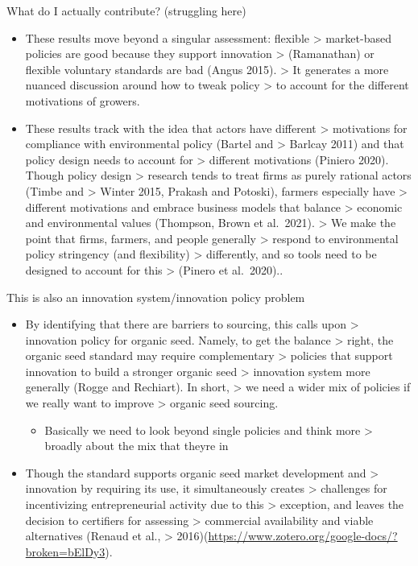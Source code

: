 \documentclass[twoside,12pt,final]{ucthesis-CA2012}
\providecommand{\tightlist}{%
  \setlength{\itemsep}{0pt}\setlength{\parskip}{0pt}}
\begin{document}
\begin{ucmainmatter}
What do I actually contribute? (struggling here)
\begin{itemize}
\item
  These results move beyond a singular assessment: flexible
  \textgreater{} market-based policies are good because they support innovation
  \textgreater{} (Ramanathan) or flexible voluntary standards are bad (Angus 2015).
  \textgreater{} It generates a more nuanced discussion around how to tweak policy
  \textgreater{} to account for the different motivations of growers.
\item
  These results track with the idea that actors have different
  \textgreater{} motivations for compliance with environmental policy (Bartel and
  \textgreater{} Barlcay 2011) and that policy design needs to account for
  \textgreater{} different motivations (Piniero 2020). Though policy design
  \textgreater{} research tends to treat firms as purely rational actors (Timbe and
  \textgreater{} Winter 2015, Prakash and Potoski), farmers especially have
  \textgreater{} different motivations and embrace business models that balance
  \textgreater{} economic and environmental values (Thompson, Brown et al.~2021).
  \textgreater{} We make the point that firms, farmers, and people generally
  \textgreater{} respond to environmental policy stringency (and flexibility)
  \textgreater{} differently, and so tools need to be designed to account for this
  \textgreater{} (Pinero et al.~2020)..
\end{itemize}
This is also an innovation system/innovation policy problem
\begin{itemize}
\item
  By identifying that there are barriers to sourcing, this calls upon
  \textgreater{} innovation policy for organic seed. Namely, to get the balance
  \textgreater{} right, the organic seed standard may require complementary
  \textgreater{} policies that support innovation to build a stronger organic seed
  \textgreater{} innovation system more generally (Rogge and Rechiart). In short,
  \textgreater{} we need a wider mix of policies if we really want to improve
  \textgreater{} organic seed sourcing.
  \begin{itemize}
  \tightlist
  \item
    Basically we need to look beyond single policies and think more
    \textgreater{} broadly about the mix that they\textquotesingle re in
  \end{itemize}
\item
  Though the standard supports organic seed market development and
  \textgreater{} innovation by requiring its use, it simultaneously creates
  \textgreater{} challenges for incentivizing entrepreneurial activity due to this
  \textgreater{} exception, and leaves the decision to certifiers for assessing
  \textgreater{} commercial availability and viable alternatives (Renaud et al.,
  \textgreater{} 2016)(\url{https://www.zotero.org/google-docs/?broken=bElDy3}).
\end{itemize}
\hypertarget{reckoning-with-identities-of-environmental-movements}{%
}
\end{ucmainmatter}
\end{document}
